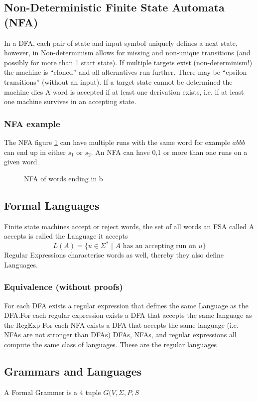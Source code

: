 \subsection{Non-Deterministic Finite State Automata (NFA)}
In a DFA, each pair of state and input symbol uniquely defines a next state, however, in Non-determinism allows for missing and non-unique transitions (and possibly for more than 1 start state). If multiple targets exist (non-determinism!) the machine is “cloned” and all alternatives run further. There may be “epsilon-transitions” (without an input). If a target state cannot be determined the machine dies
A word is accepted if at least one derivation exists, i.e. if at least
one machine survives in an accepting state.
\subsubsection{NFA example}
The NFA figure \ref{fig:NFA*} can have multiple runs with the same word for example $abbb$ can end up in either $s_1$ or $s_2$. An NFA can have 0,1 or more than one runs on a given word.
\begin{figure}[H]
    \centering
    \caption{NFA of words ending in b}
    \label{fig:NFA*}
\end{figure}
\subsection{Formal Languages}
Finite state machines accept or reject words, the set of all words an FSA called A accepts is called the Language it accepts 
\begin{equation}
    L(A) = \{u \in \Sigma^* \,\,|\,\, A \text{ has an accepting run on }u\}
\end{equation}
Regular Expressions characterise words as well, thereby they also define Languages.
\subsubsection{Equivalence (without proofs)}
For each DFA exists a regular expression that defines the same Language as the DFA.For each regular expression exists a DFA that accepts the same language as the RegExp For each NFA exists a DFA that accepts the same language (i.e. NFAs are not stronger than DFAs) DFAs, NFAs, and regular expressions all compute the same class of languages. These are the regular languages
\subsection{Grammars and Languages}
A Formal Grammer is a 4 tuple $G(V,\Sigma,P,S$
